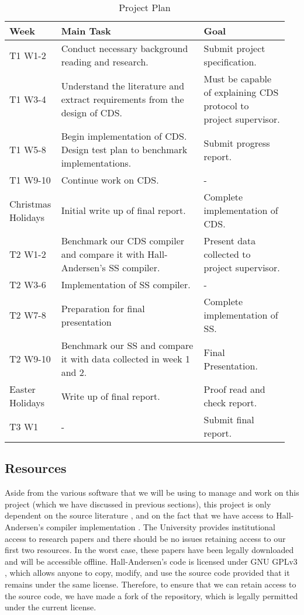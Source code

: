 \newcommand{\rowheight}{0.7em}

\begin{table}[H]
\centering
\caption{Project Plan}
\begin{tabular}{p{0.15\linewidth}p{0.5\linewidth}p{0.3\linewidth}}
\toprule
\bf Week & \bf Main Task & \bf Goal \\ 
\midrule
T1 W1-2
& Conduct necessary background reading and research.
& Submit project specification. \\\addlinespace[\rowheight]
T1 W3-4
& Understand the literature and extract requirements from the design of CDS.
& Must be capable of explaining CDS protocol to project supervisor. \\\addlinespace[\rowheight]
T1 W5-8
& Begin implementation of CDS. Design test plan to benchmark implementations.
& Submit progress report. \\\addlinespace[\rowheight]
T1 W9-10
& Continue work on CDS.
& - \\\addlinespace[\rowheight]
Christmas Holidays
& Initial write up of final report.
& Complete implementation of CDS. \\\addlinespace[\rowheight]
T2 W1-2
& Benchmark our CDS compiler and compare it with Hall-Andersen's SS compiler.
& Present data collected to project supervisor. \\\addlinespace[\rowheight]
T2 W3-6
& Implementation of SS compiler.
& - \\\addlinespace[\rowheight]
T2 W7-8
& Preparation for final presentation
& Complete implementation of SS. \\\addlinespace[\rowheight]
T2 W9-10
& Benchmark our SS and compare it with data collected in week 1 and 2.
& Final Presentation. \\\addlinespace[\rowheight]
Easter Holidays
& Write up of final report. 
& Proof read and check report. \\\addlinespace[\rowheight]
T3 W1
& -
& Submit final report. \\
\bottomrule
\end{tabular}
\label{table:timetable}
\end{table}

\subsection{Resources}

Aside from the various software that we will be using to manage and work on this project (which we have discussed in previous sections), this project is only dependent on the source literature \cite{CDS94, StackingSigmas}, and on the fact that we have access to Hall-Andersen's compiler implementation \cite{MHAStackSig}. The University provides institutional access to research papers and there should be no issues retaining access to our first two resources. In the worst case, these papers have been legally downloaded and will be accessible offline. Hall-Andersen's code is licensed under GNU GPLv3 \cite{GPLv3}, which allows anyone to copy, modify, and use the source code provided that it remains under the same license. Therefore, to ensure that we can retain access to the source code, we have made a fork of the repository, which is legally permitted under the current license. 

